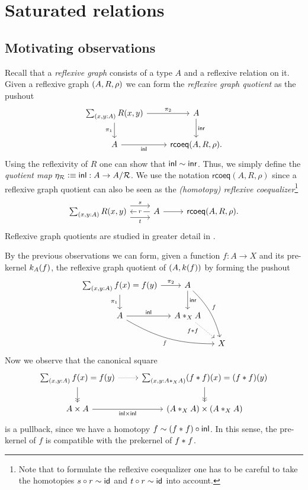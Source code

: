 \section{Saturated relations}
\subsection{Motivating observations}
Recall that a \emph{reflexive graph} consists of a type $A$ and a reflexive relation on it. Given a reflexive graph ${\mathopen{}(A,R,\rho)\mathclose{}}$ we can form the \emph{reflexive graph quotient} as the pushout
\begin{equation*}
\begin{tikzcd}
\sm{x,y:A}R(x,y) \arrow[r,"\pi_2"] \arrow[d,swap,"\pi_1"] & A \arrow[d,"\inr"] \\
A \arrow[r,swap,"\inl"] & \mathsf{rcoeq}(A,R,\rho).
\end{tikzcd}
\end{equation*}
Using the reflexivity of $R$ one can show that ${\mathsf{inl}}\sim {\mathsf{inr}}$. Thus, we simply define the \emph{quotient map} $\eta_{\mathcal{R}}\vcentcolon\equiv {\mathsf{inl}} : A\to A/\mathcal{R}$. We use the notation $\mathsf{rcoeq}(A,R,\rho)$ since a reflexive graph quotient can also be seen as the \emph{(homotopy) reflexive coequalizer}\footnote{Note that to formulate the reflexive coequalizer one has to be careful to take the homotopies $s\circ r\sim \mathsf{id}_{}$ and $t\circ r\sim \mathsf{id}_{}$ into account.}
\begin{equation*}
\begin{tikzcd}
\sm{x,y:A}R(x,y) \arrow[r,yshift=.7em,"s"] \arrow[r,yshift=-.7em,swap,"t"] & A \arrow[l,"r" description] \arrow[r] & \mathsf{rcoeq}(A,R,\rho).
\end{tikzcd}
\end{equation*}
Reflexive graph quotients are studied in greater detail in \cite{graphquotients}.

By the previous observations we can form, given a function $f : A \to X$ and its pre-kernel $k_A(f)$, the reflexive graph quotient of ${\mathopen{}(A,k(f))\mathclose{}}$ by forming the pushout
\begin{equation*}
\begin{tikzcd}[column sep=small]
\sm{x,y:A} f(x)=f(y) \arrow[r,"\pi_2"] \arrow[d,swap,"\pi_1"] & A \arrow[d,"\inr"] \arrow[ddr,bend left=15,"f"] \\
A \arrow[r,"\inl"] \arrow[drr,bend right=15,swap,"f"] & A \ast_X A \arrow[dr,densely dotted,swap,"f\ast f" near start] \\
& & X
\end{tikzcd}
\end{equation*}
Now we observe that the canonical square
\begin{equation*}
\begin{tikzcd}
\sm{x,y:A}f(x)=f(y) \arrow[d,->>] \arrow[r,densely dotted] & \sm{x,y:A \ast_X A} (f\ast f)(x)=(f\ast f)(y) \arrow[d,->>] \\
A\times A \arrow[r,swap,"\inl\times\inl"] & (A\ast_X A)\times (A\ast_X A)
\end{tikzcd}
\end{equation*}
is a pullback, since we have a homotopy $f\sim ({f}\ast_{}{f})\circ{\mathsf{inl}}$. 
In this sense, the pre-kernel of $f$ is compatible with the prekernel of ${f}\ast_{}{f}$.


